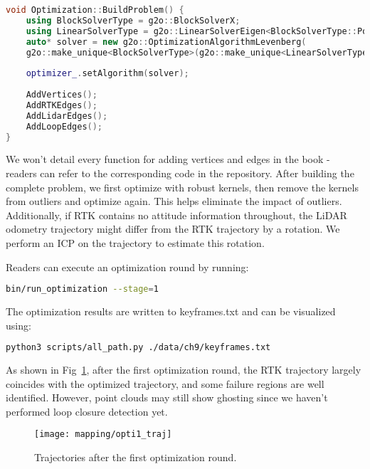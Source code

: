 \begin{lstlisting}[language=c++,caption=src/ch9/optimization.cc]
void Optimization::BuildProblem() {
	using BlockSolverType = g2o::BlockSolverX;
	using LinearSolverType = g2o::LinearSolverEigen<BlockSolverType::PoseMatrixType>;
	auto* solver = new g2o::OptimizationAlgorithmLevenberg(
	g2o::make_unique<BlockSolverType>(g2o::make_unique<LinearSolverType>()));
	
	optimizer_.setAlgorithm(solver);
	
	AddVertices();
	AddRTKEdges();
	AddLidarEdges();
	AddLoopEdges();
}
\end{lstlisting}

We won't detail every function for adding vertices and edges in the book - readers can refer to the corresponding code in the repository. After building the complete problem, we first optimize with robust kernels, then remove the kernels from outliers and optimize again. This helps eliminate the impact of outliers. Additionally, if RTK contains no attitude information throughout, the LiDAR odometry trajectory might differ from the RTK trajectory by a rotation. We perform an ICP on the trajectory to estimate this rotation.

Readers can execute an optimization round by running:

\begin{lstlisting}[language=sh,caption=Terminal command:]
bin/run_optimization --stage=1
\end{lstlisting}

The optimization results are written to keyframes.txt and can be visualized using:

\begin{lstlisting}[language=sh,caption=Terminal command:]
python3 scripts/all_path.py ./data/ch9/keyframes.txt 
\end{lstlisting}

As shown in Fig~\ref{fig:opti1-traj}, after the first optimization round, the RTK trajectory largely coincides with the optimized trajectory, and some failure regions are well identified. However, point clouds may still show ghosting since we haven't performed loop closure detection yet.

\begin{figure}
	\centering
	\texttt{[image: mapping/opti1\_traj]}
	\caption{Trajectories after the first optimization round.}
	\label{fig:opti1-traj}
\end{figure}


